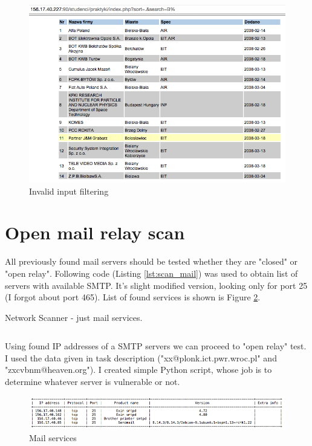 \documentclass[a4paper, 11pt]{article}
\begin{document}
\begin{figure}[!htb]
  \centering
      \includegraphics[width=1\textwidth]{apache/sql_inject}
  \caption{Invalid input filtering}
  \label{fig:sql_inject}    
\end{figure}

\section*{Open mail relay scan}
All previously found mail servers should be tested whether they are "closed" or "open relay". 
Following code (Listing \ref{lst:scan_mail}) was used to obtain list of servers with available SMTP.
It's slight modified version, looking only for port 25 (I forgot about port 465). List of found services is shown is Figure \ref{fig:mail_scan}.

\begin{listing}[!htb]    
\caption{Network Scanner - just mail services.}    
\inputminted[mathescape, fontfamily=tt, frame=leftline,framerule=0.4pt,framesep=2mm]{python}{scripts/scan_mail.py}
\label{lst:scan_mail}    
\end{listing}

Using found IP addresses of a SMTP servers we can proceed to "open relay" test. I used the data given in task description ("xx@plonk.ict.pwr.wroc.pl" and "zxcvbnm@heaven.org"). I created simple Python script, whose job is to determine whatever server is vulnerable or not.

\begin{figure}[!htb]
  \centering
      \includegraphics[width=1\textwidth]{tables/mail_scan_all}
  \caption{Mail services}
  \label{fig:mail_scan}    
\end{figure}
\end{document}
